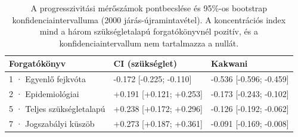 \begin{table}[htbp]
\centering
\small
\caption{A progresszivitási mérőszámok pontbecslése és 95\%-os bootstrap konfidenciaintervalluma (2000 járás-újramintavétel). A koncentrációs index mind a három szükségletalapú forgatókönyvnél pozitív, és a konfidenciaintervallum nem tartalmazza a nullát.}
\label{tab:bootstrap}
\begin{tabular}{p{3.4cm}p{5.2cm}p{5.2cm}}
\toprule
Forgatókönyv & CI (szükséglet) & Kakwani \\
\midrule
1 · Egyenlő fejkvóta & -0.172 [-0.225; -0.110] & -0.536 [-0.596; -0.459] \\
2 · Epidemiológiai & +0.191 [+0.121; +0.253] & -0.173 [-0.243; -0.102] \\
5 · Teljes szükségletalapú & +0.238 [+0.172; +0.296] & -0.126 [-0.192; -0.062] \\
7 · Jogszabályi küszöb & +0.273 [+0.187; +0.361] & -0.091 [-0.169; -0.008] \\
\bottomrule
\end{tabular}
\end{table}
